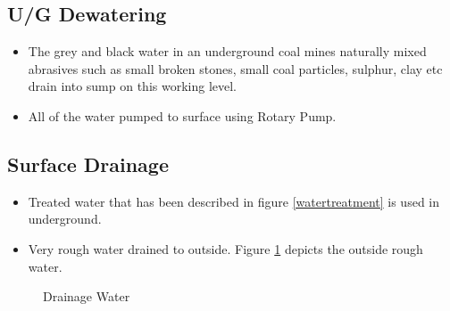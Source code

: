 \documentclass[12pt,a4paper]{article}
\begin{document}
\subsection{U/G Dewatering}
\begin{itemize}
\item The grey and black water in an underground coal mines naturally mixed abrasives such as small broken stones, small coal particles, sulphur, clay etc drain into sump on this working level.
\item All of the water pumped to surface using Rotary Pump.
\end{itemize}

\subsection{Surface Drainage}
\begin{itemize}
\item Treated water that has been described in figure \ref{watertreatment} is used in underground.
\item Very rough water drained to outside. Figure \ref{drainage} depicts the outside rough water.
\end{itemize}

\begin{figure}[ht]
\centering
{}
\caption{Drainage Water}
\label{drainage}
\end{figure}
\clearpage
\end{document}
